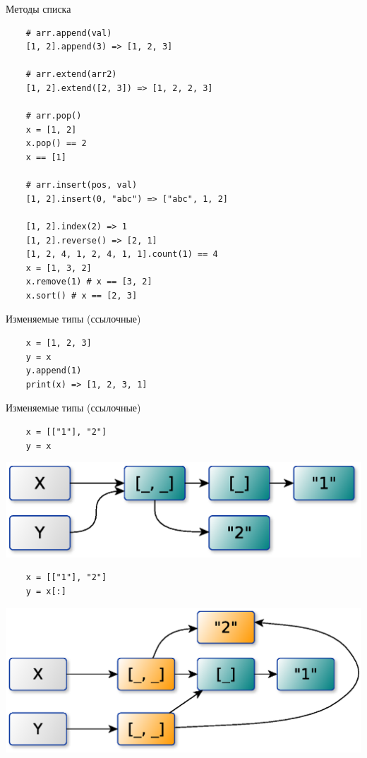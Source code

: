 \documentclass{article}
\begin{document}
\begin{center} Методы списка \end{center}
\begin{Large}
\vspace{15pt}
\begin{lstlisting}
	# arr.append(val)
	[1, 2].append(3) => [1, 2, 3]

	# arr.extend(arr2)
	[1, 2].extend([2, 3]) => [1, 2, 2, 3]

	# arr.pop()
	x = [1, 2]
	x.pop() == 2
	x == [1]

	# arr.insert(pos, val)
	[1, 2].insert(0, "abc") => ["abc", 1, 2]

	[1, 2].index(2) => 1
	[1, 2].reverse() => [2, 1]
	[1, 2, 4, 1, 2, 4, 1, 1].count(1) == 4
	x = [1, 3, 2]
	x.remove(1) # x == [3, 2]
	x.sort() # x == [2, 3]
\end{lstlisting}
\end{Large}
\newpage

\begin{center} Изменяемые типы (ссылочные) \end{center}
\vspace{15pt}
\begin{lstlisting}
	x = [1, 2, 3]
	y = x
	y.append(1)
	print(x) => [1, 2, 3, 1]
\end{lstlisting}
\newpage

\begin{center} Изменяемые типы (ссылочные) \end{center}
\begin{lstlisting}
	x = [["1"], "2"]
	y = x
\end{lstlisting}
\includegraphics[scale=0.8]{images/refs1.eps}

\begin{lstlisting}
	x = [["1"], "2"]
	y = x[:]
\end{lstlisting}
\includegraphics[scale=0.8]{images/refs2.eps}
\newpage
\end{document}
